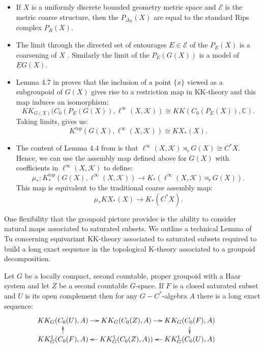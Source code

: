 \begin{remark}
\begin{itemize}
\item If $X$ is a uniformly discrete bounded geometry metric space and $\mathcal{E}$ is the metric coarse structure, then the $P_{\Delta_{R}}(X)$ are equal to the standard Rips complex $P_{R}(X)$.
\item The limit through the directed set of entourages $E \in \mathcal{E}$ of the $P_{E}(X)$ is a coarsening of $X$ \cite{MR1399087}. Similarly the limit of the $P_{E}(G(X))$ is a model of $\underline{E}G(X)$.
\item Lemma 4.7 in \cite{MR1905840} proves that the inclusion of a point $\lbrace x \rbrace$ viewed as a subgroupoid of $G(X)$ gives rise to a restriction map in KK-theory and this map induces an isomorphism:
\begin{equation*}
KK_{G(X)}(C_{0}(P_{E}(G(X)),\ell^{\infty}(X,\mathcal{K})) \cong KK(C_{0}(P_{E}(X)),\mathbb{C}).
\end{equation*}
Taking limits, gives us:
\begin{equation*}
K^{top}(G(X),\ell^{\infty}(X,\mathcal{K})) \cong KX_{*}(X).
\end{equation*}
\item The content of Lemma 4.4 from \cite{MR1905840} is that $\ell^{\infty}(X,\mathcal{K}) \rtimes_{r} G(X) \cong C^{*}X$. Hence, we can use the assembly map defined above for $G(X)$ with coefficients in $\ell^{\infty}(X,\mathcal{K})$ to define:
\begin{equation*}
\mu_{*}:K^{top}_{*}(G(X),\ell^{\infty}(X,\mathcal{K})) \rightarrow K_{*}(\ell^{\infty}(X,\mathcal{K})\rtimes_{r}G(X)).
\end{equation*}
This map is equivalent to the traditional coarse assembly map:
\begin{equation*}
\mu_{*}KX_{*}(X)\rightarrow K_{*}(C^{*}X).
\end{equation*}
\end{itemize}
\end{remark}

One flexibility that the groupoid picture provides is the ability to consider natural maps associated to saturated subsets. We outline a technical Lemma of Tu concerning equivariant KK-theory associated to saturated subsets required to build a long exact sequence in the topological K-theory associated to a groupoid decomposition.

\begin{lemma}
Let $G$ be a locally compact, second countable, proper groupoid with a Haar system and let $Z$ be a second countable $G$-space. If $F$ is a closed saturated subset and $U$ is its open complement then for any $G-C^{*}$-algebra $A$ there is a long exact sequence:
\begin{equation*}
\xymatrix@=1em{
KK_{G}(C_{0}(U),A) \ar[r] & KK_{G}(C_{0}(Z),A) \ar[r]& KK_{G}(C_{0}(F),A)\ar[d] & \\
KK^{1}_{G}(C_{0}(F),A)\ar[u]& KK^{1}_{G}(C_{0}(Z),A)) \ar[l]& KK^{1}_{G}(C_{0}(U),A)\ar[l] &
}
\end{equation*}
\end{lemma}

